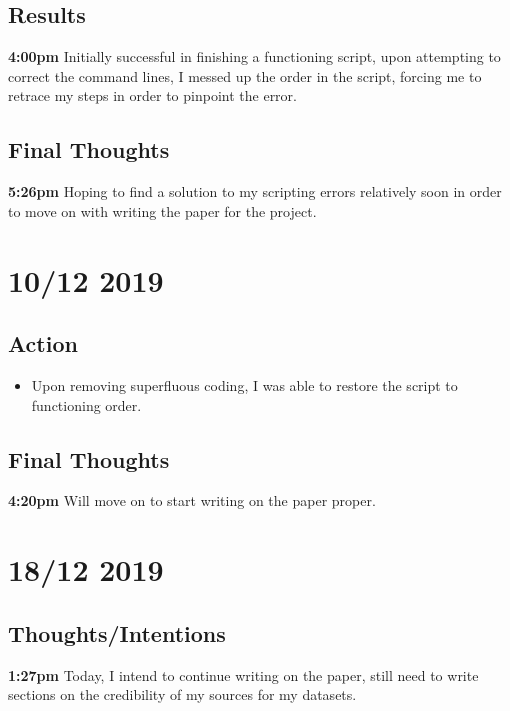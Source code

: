 \documentclass{article}
\begin{document}
\subsection{Results}

\textbf{4:00pm} Initially successful in finishing a functioning script, upon attempting to correct the command lines, I messed up the order in the script, forcing me to retrace my steps in order to pinpoint the error.

\subsection{Final Thoughts}

\textbf{5:26pm} Hoping to find a solution to my scripting errors relatively soon in order to move on with writing the paper for the project.

\section{10/12 2019}
\subsection{Action}
\begin{itemize}
    \item Upon removing superfluous coding, I was able to restore the script to functioning order.
\end{itemize}

\subsection{Final Thoughts}

\textbf{4:20pm} Will move on to start writing on the paper proper.

\section{18/12 2019}
\subsection{Thoughts/Intentions}

\textbf{1:27pm} Today, I intend to continue writing on the paper, still need to write sections on the credibility of my sources for my datasets.
\end{document}
